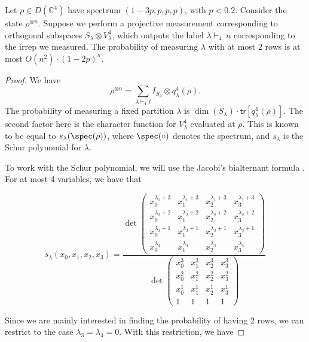 \documentclass[11pt]{article}
\begin{document}
\begin{lemma}\label{lem:two_row_prob}
    Let $\rho\in D(\mathbb C^4)$ have spectrum $(1-3p,p,p,p)$, with $p<0.2$. Consider the state $\rho^{\otimes n}$. Suppose we perform a projective measurement corresponding to orthogonal subspaces $S_\lambda\otimes V^4_{\lambda}$, which outputs the label $\lambda\vdash_4\,n$ corresponding to the irrep we measured. The probability of measuring $\lambda$ with at most $2$ rows is at most $O(n^2)\cdot (1-2p)^n$.
\end{lemma}
\begin{proof}
We have \[\rho^{\otimes n}= \sum_{\lambda \vdash_4\, l} I_{S_\lambda}\otimes q_\lambda^4(\rho).\]
The probability of measuring a fixed partition $\lambda$ is $\dim(S_\lambda)\cdot \mathsf{tr}[q_\lambda^4(\rho)]$. The second factor here is the character function for $V^4_\lambda$ evaluated at $\rho$. This is known to be equal to $s_\lambda(\spec(\rho))$, where $\spec(\circ)$ denotes the spectrum, and $s_\lambda$ is the Schur polynomial for $\lambda$. 

To work with the Schur polynomial, we will use the Jacobi's bialternant formula \cite{StanleyEC2}. For at most 4 variables, we have that

    \[s_\lambda(x_0,x_1,x_2,x_3)=\frac{\det\begin{pmatrix}
        x_0^{\lambda_1+3}&x_1^{\lambda_1+3}&x_2^{\lambda_1+3}&x_3^{\lambda_1+3}\\
        x_0^{\lambda_2+2}&x_1^{\lambda_2+2}&x_2^{\lambda_2+2}&x_3^{\lambda_2+2}\\
        x_0^{\lambda_3+1}&x_1^{\lambda_3+1}&x_2^{\lambda_3+1}&x_3^{\lambda_3+1}\\
        x_0^{\lambda_4}&x_1^{\lambda_4}&x_2^{\lambda_4}&x_3^{\lambda_4}
    \end{pmatrix}}{\det\begin{pmatrix}
        x_0^{3}&x_1^{3}&x_2^{3}&x_3^{3}\\
        x_0^{2}&x_1^{2}&x_2^{2}&x_3^{2}\\
        x_0^{1}&x_1^{1}&x_2^{1}&x_3^{1}\\
        1&1&1&1
    \end{pmatrix}}\]

    Since we are mainly interested in finding the probability of having 2 rows, we can restrict to the case $\lambda_3=\lambda_4=0$.
    With this restriction, we have


\end{proof}
\end{document}
